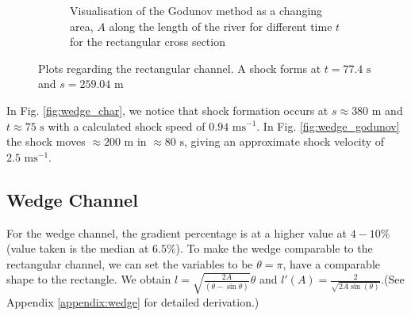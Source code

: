 \documentclass[12pt]{article}
\begin{document}
\begin{figure}[H]
\begin{subfigure}[b]{0.49\textwidth}
        \caption{Visualisation of the Godunov method as a changing area, $A$ along the length of the river for different time $t$ for the rectangular cross section}
        \label{fig:rect_godunov}
    \end{subfigure}
    \caption{Plots regarding the rectangular channel. A shock forms at $t = 77.4\text{ s}$ and $s = 259.04\text{ m}$}
\end{figure}

In Fig. \ref{fig:wedge_char}, we notice that shock formation occurs at $s\approx 380\text{ m}$ and $t\approx 75\text{ s}$ with a calculated shock speed of $ 0.94\text{ ms}^{-1}$. In Fig. \ref{fig:wedge_godunov} the shock moves $\approx200\text{ m}$ in $\approx 80 \text{ s}$, giving an approximate shock velocity of $ 2.5\text{ ms}^{-1}$.

\subsection{Wedge Channel}
For the wedge channel, the gradient percentage is at a higher value at $4-10\%$ (value taken is the median at $6.5\%$). To make the wedge comparable to the rectangular channel, we can set the variables to be $\theta = \pi$, have a comparable shape to the rectangle. We obtain $l =\sqrt{\frac{2A}{\left(\theta - \sin\theta\right)}}\theta$ and $l'(A) =\frac{2}{\sqrt{2A\sin(\theta)}}$.(See Appendix \ref{appendix:wedge} for detailed derivation.)
\end{document}
